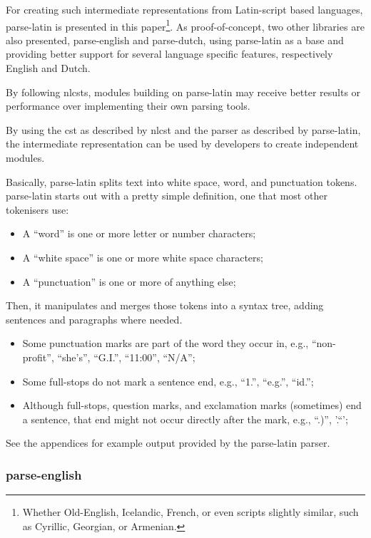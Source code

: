 For creating such intermediate representations from Latin-script based
languages, parse-latin is presented in this paper\footnote{Whether
  Old-English, Icelandic, French, or even scripts slightly similar, such
  as Cyrillic, Georgian, or Armenian.}. As proof-of-concept, two other
libraries are also presented, parse-english and parse-dutch, using
parse-latin as a base and providing better support for several language
specific features, respectively English and Dutch.

By following \glspl{nlcst}, modules building on parse-latin may receive
better results or performance over implementing their own parsing tools.

By using the \gls{cst} as described by \gls{nlcst} and the parser as
described by parse-latin, the intermediate representation can be used by
developers to create independent modules.

Basically, parse-latin splits text into white space, word, and
punctuation tokens. parse-latin starts out with a pretty simple
definition, one that most other tokenisers use:

\begin{itemize}
\itemsep1pt\parskip0pt
\item
  A ``word'' is one or more letter or number characters;
\item
  A ``white space'' is one or more white space characters;
\item
  A ``punctuation'' is one or more of anything else;
\end{itemize}

Then, it manipulates and merges those tokens into a syntax tree, adding
sentences and paragraphs where needed.

\begin{itemize}
\itemsep1pt\parskip0pt
\item
  Some punctuation marks are part of the word they occur in, e.g.,
  ``non-profit'', ``she's'', ``G.I.'', ``11:00'', ``N\slash A'';
\item
  Some full-stops do not mark a sentence end, e.g., ``1.'', ``e.g.'',
  ``id.'';
\item
  Although full-stops, question marks, and exclamation marks (sometimes)
  end a sentence, that end might not occur directly after the mark,
  e.g., ``.)'', '.``';
\end{itemize}

See the appendices for example output provided by the parse-latin
parser.

\subsubsection{parse-english}\label{parse-english}

